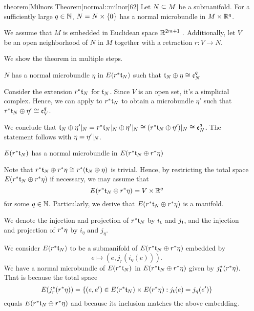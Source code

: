 \begin{scope} \newcommand{\rwhitney} { \whitney{\ind{r}\bt_N}{\ind{r}\eta} } \newcommand{\rtn} { \ind{r}\bt_N }

\begin{mystatement}{theorem}[Milnors Theorem]{normal::milnor}[62] Let $N \sub M$ be a submanifold. For a sufficiently large $q \in \N$, $N = \cyldown{N}$ has a normal microbundle in $M \cross \R^q$. \end{mystatement}

\begin{myproof} We assume that $M$ is embedded in Euclidean space $\R^{2m + 1}$ \cite[p.60]{dimension}. Additionally, let $V$ be an open neighborhood of $N$ in $M$ together with a retraction $r: V \to N$.

We show the theorem in multiple steps. \begin{steps} \item $N$ has a normal microbundle $\eta$ in $E(\ind{r}\bt_N)$ such that $\whitney{\bt_N}{\eta} \cong \be[q]{N}$

Consider the extension $\ind{r}\bt_N$ for $\bt_N$. Since $V$ is an open set, it's a simplicial complex. Hence, we can apply  to $\ind{r}\bt_N$ to obtain a microbundle $\eta'$ such that $\whitney{\ind{r}\bt_N}{\eta'} \cong \be[q]{V}$.

We conclude that $\whitney{\bt_N}{\eta'\restr{N}} = \whitney{\ind{r}\bt_N\restr{N}}{\eta'\restr{N}} \cong (\whitney{\ind{r}\bt_N}{\eta'})\restr{N} \cong \be[q]{N}$.
The statement follows with $\eta = \eta'\restr{N}$.

\item $E(\rtn)$ has a normal microbundle in $E(\rwhitney)$

Note that $\rwhitney \cong \ind{r}(\whitney{\bt_N}{\eta})$ is trivial. Hence, by restricting the total space $E(\rwhitney)$ if necessary, we may assume that \[ E(\rwhitney) = V \cross \R^q \] for some $q \in \N$. Particularly, we derive that $E(\rwhitney)$ is a manifold.

We denote the injection and projection of $\rtn$ by $i_{\bt}$ and $j_{\bt}$, and the injection and projection of $\ind{r}\eta$ by $i_{\eta}$ and $j_{\eta}$.

We consider $E(\rtn)$ to be a submanifold of $E(\rwhitney)$ embedded by \[ e \mapsto (e, j_{r}(i_{\eta}(e))). \] We have a normal microbundle of $E(\rtn)$ in $E(\rwhitney)$ given by $\ind{j_{\bt}}(\ind{r}\eta)$. That is because the total space \[ E(\ind{j_r}(\ind{r}\eta)) = \set{(e, e') \in E(\rtn) \cross E(\ind{r}\eta)}{j_{\bt}(e) = j_\eta(e')} \] equals $E(\rwhitney)$ and because its inclusion matches the above embedding.


\end{steps}
\end{myproof}
\end{scope}
